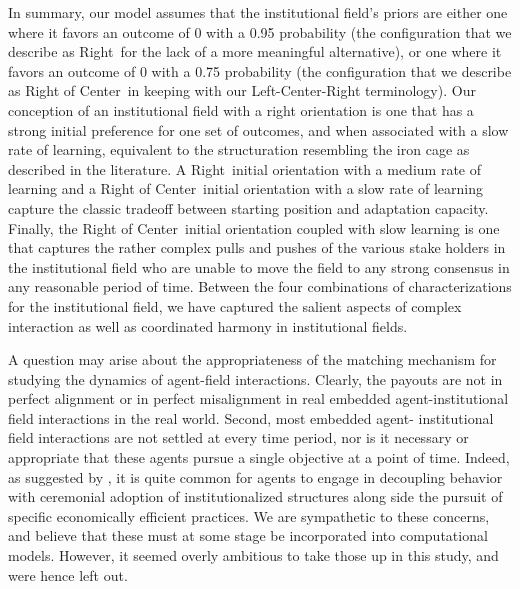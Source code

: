\documentclass[12pt,letterpaper]{article}
\begin{document}
In summary, our model assumes that the institutional field's priors are either one where it favors an outcome of 0 with a 0.95 probability (the configuration that we describe as \textquotesingle Right\textquotesingle \ for the lack of a more meaningful alternative), or one where it favors an outcome of 0 with a 0.75 probability (the configuration that we describe as \textquotesingle Right of Center\textquotesingle \  in keeping with our Left-Center-Right terminology). Our conception of an institutional field with a right orientation is one that has a strong initial preference for one set of outcomes, and when associated with a slow rate of learning, equivalent to the structuration resembling the iron cage as described in the literature. A \textquotesingle Right\textquotesingle \ initial orientation with a medium rate of learning and a \textquotesingle Right of Center\textquotesingle \ initial orientation with a slow rate of learning capture the classic tradeoff between starting position and adaptation capacity. Finally, the \textquotesingle Right of Center\textquotesingle \ initial orientation coupled with slow learning is one that captures the rather complex pulls and pushes of the various stake holders in the institutional field who are unable to move the field to any strong consensus in any reasonable period of time. Between the four combinations of characterizations for the institutional field,  we have captured the salient aspects of complex interaction as well as coordinated harmony in institutional fields.

A question may arise about the appropriateness of the matching mechanism for studying the dynamics of agent-field interactions. Clearly, the payouts are not in perfect alignment or in perfect misalignment in real embedded agent-institutional field interactions in the real world. Second, most embedded agent- institutional field interactions are not settled at every time period, nor is it necessary or appropriate that these agents pursue a single objective at a point of time. Indeed, as suggested by \cite{Kostova2008}, it is quite common for agents to engage in decoupling behavior with ceremonial adoption of institutionalized structures along side the pursuit of specific economically efficient practices. We are sympathetic to these concerns, and believe that these must at some stage be incorporated into computational models. However, it seemed overly ambitious to take those up in this study, and were hence left out.
\end{document}
